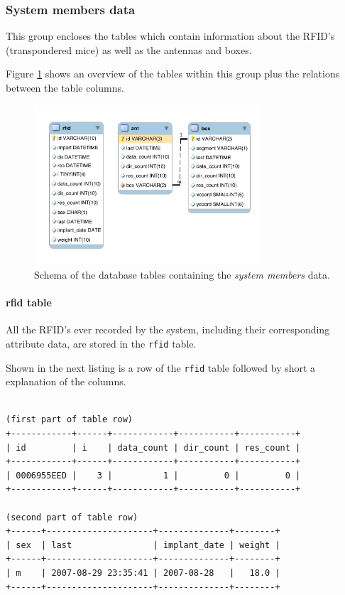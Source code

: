 \subsubsection{System members data}
\label{subsubsec:system_members_tables}

This group encloses the tables which contain information about the RFID's (transpondered mice) as well as the antennas and boxes.

Figure \ref{fig:system_members} shows an overview of the tables within this group plus the relations between the table columns. 

\begin{figure}[htpb]
\begin{center}
  \includegraphics[width=0.75\textwidth]{assets/pdf/system_members_schema.pdf}
  \caption[Schema of database tables containing the system member data]{Schema of the database tables containing the \textit{system members} data.}
  \label{fig:system_members}
\end{center}
\end{figure}

\paragraph{rfid table}
\label{para:rfid_table}

All the RFID's ever recorded by the system, including their corresponding attribute data, are stored in the \lstinline|rfid| table.

Shown in the next listing is a row of the \lstinline|rfid| table followed by short a explanation of the columns.
\codescript
{}
\begin{lstlisting}[frame=none]

(first part of table row)
+------------+------+------------+-----------+-----------+
| id         | i    | data_count | dir_count | res_count |
+------------+------+------------+-----------+-----------+
| 0006955EED |    3 |          1 |         0 |         0 |
+------------+------+------------+-----------+-----------+

(second part of table row)
+------+---------------------+--------------+--------+
| sex  | last                | implant_date | weight |
+------+---------------------+--------------+--------+
| m    | 2007-08-29 23:35:41 | 2007-08-28   |   18.0 |
+------+---------------------+--------------+--------+

\end{lstlisting}

